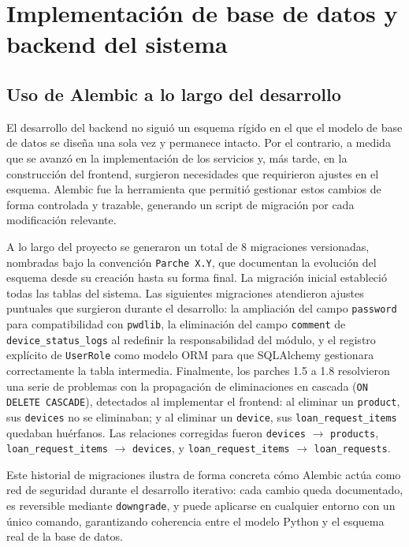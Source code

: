 \section{Implementación de base de datos y backend del sistema}

\subsection{Uso de Alembic a lo largo del desarrollo}\label{sec:alembic_uso}

El desarrollo del backend no siguió un esquema rígido en el que el modelo de base de datos se diseña una sola vez y permanece intacto. Por el contrario, a medida que se avanzó en la implementación de los servicios y, más tarde, en la construcción del frontend, surgieron necesidades que requirieron ajustes en el esquema. Alembic fue la herramienta que permitió gestionar estos cambios de forma controlada y trazable, generando un script de migración por cada modificación relevante.

A lo largo del proyecto se generaron un total de 8 migraciones versionadas, nombradas 
bajo la convención \texttt{Parche X.Y}, que documentan la evolución del esquema desde 
su creación hasta su forma final. La migración inicial estableció todas las tablas del 
sistema. Las siguientes migraciones atendieron ajustes puntuales que surgieron durante 
el desarrollo: la ampliación del campo \texttt{password} para compatibilidad con 
\texttt{pwdlib}, la eliminación del campo \texttt{comment} de \texttt{device\_status\_logs} 
al redefinir la responsabilidad del módulo, y el registro explícito de \texttt{UserRole} 
como modelo ORM para que SQLAlchemy gestionara correctamente la tabla intermedia. 
Finalmente, los parches 1.5 a 1.8 resolvieron una serie de problemas con la propagación 
de eliminaciones en cascada (\texttt{ON DELETE CASCADE}), detectados al implementar el 
frontend: al eliminar un \texttt{product}, sus \texttt{devices} no se eliminaban; y al 
eliminar un \texttt{device}, sus \texttt{loan\_request\_items} quedaban huérfanos. Las 
relaciones corregidas fueron \texttt{devices} $\rightarrow$ \texttt{products}, 
\texttt{loan\_request\_items} $\rightarrow$ \texttt{devices}, y 
\texttt{loan\_request\_items} $\rightarrow$ \texttt{loan\_requests}.

Este historial de migraciones ilustra de forma concreta cómo Alembic actúa como red de seguridad durante el desarrollo iterativo: cada cambio queda documentado, es reversible mediante \texttt{downgrade}, y puede aplicarse en cualquier entorno con un único comando, garantizando coherencia entre el modelo Python y el esquema real de la base de datos.

